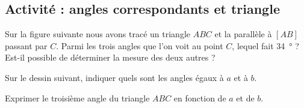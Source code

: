 
\subsection*{Activité : angles correspondants et triangle}

Sur la figure suivante nous avons tracé un triangle \( ABC\) et la parallèle à \( [AB]\) passant par \( C\). Parmi les trois angles que l'on voit au point \( C\), lequel fait \SI{34}{\degree} ? Est-il possible de déterminer la mesure des deux autres ?

\begin{center}
   
\end{center}


Sur le dessin suivant, indiquer quels sont les angles égaux à \( a\) et à \( b\). 
\begin{center}
    
\end{center}
Exprimer le troisième angle du triangle \( ABC\) en fonction de \( a\) et de \( b\).
